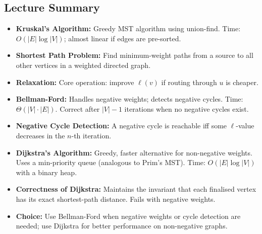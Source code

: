 \subsection{Lecture Summary}

\begin{tcolorbox}[colback=lightblue, colframe=keyblue, fonttitle=\bfseries,
                  title={Key Points}]
\begin{itemize}[noitemsep]
  \item \textbf{Kruskal's Algorithm:} Greedy MST algorithm using union-find. Time:
        $O(|E|\log|V|)$; almost linear if edges are pre-sorted.
  \item \textbf{Shortest Path Problem:} Find minimum-weight paths from a source to all other
        vertices in a weighted directed graph.
  \item \textbf{Relaxation:} Core operation: improve $\ell(v)$ if routing through $u$ is
        cheaper.
  \item \textbf{Bellman-Ford:} Handles negative weights; detects negative cycles.
        Time: $\Theta(|V| \cdot |E|)$. Correct after $|V|-1$ iterations when no negative
        cycles exist.
  \item \textbf{Negative Cycle Detection:} A negative cycle is reachable iff some $\ell$-value
        decreases in the $n$-th iteration.
  \item \textbf{Dijkstra's Algorithm:} Greedy, faster alternative for non-negative weights.
        Uses a min-priority queue (analogous to Prim's MST). Time: $O(|E|\log|V|)$ with a
        binary heap.
  \item \textbf{Correctness of Dijkstra:} Maintains the invariant that each finalised vertex
        has its exact shortest-path distance. Fails with negative weights.
  \item \textbf{Choice:} Use Bellman-Ford when negative weights or cycle detection are needed;
        use Dijkstra for better performance on non-negative graphs.
\end{itemize}
\end{tcolorbox}